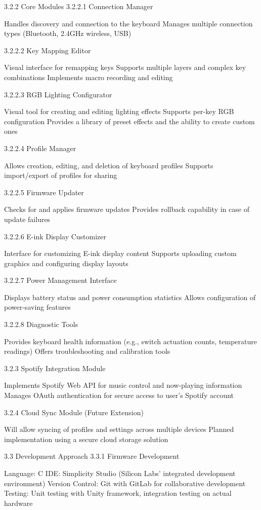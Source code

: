 \documentclass[a4paper,11pt]{article}%
\begin{document}
3.2.2 Core Modules
3.2.2.1 Connection Manager

Handles discovery and connection to the keyboard
Manages multiple connection types (Bluetooth, 2.4GHz wireless, USB)

3.2.2.2 Key Mapping Editor

Visual interface for remapping keys
Supports multiple layers and complex key combinations
Implements macro recording and editing

3.2.2.3 RGB Lighting Configurator

Visual tool for creating and editing lighting effects
Supports per-key RGB configuration
Provides a library of preset effects and the ability to create custom ones

3.2.2.4 Profile Manager

Allows creation, editing, and deletion of keyboard profiles
Supports import/export of profiles for sharing

3.2.2.5 Firmware Updater

Checks for and applies firmware updates
Provides rollback capability in case of update failures

3.2.2.6 E-ink Display Customizer

Interface for customizing E-ink display content
Supports uploading custom graphics and configuring display layouts

3.2.2.7 Power Management Interface

Displays battery status and power consumption statistics
Allows configuration of power-saving features

3.2.2.8 Diagnostic Tools

Provides keyboard health information (e.g., switch actuation counts, temperature readings)
Offers troubleshooting and calibration tools

3.2.3 Spotify Integration Module

Implements Spotify Web API for music control and now-playing information
Manages OAuth authentication for secure access to user's Spotify account

3.2.4 Cloud Sync Module (Future Extension)

Will allow syncing of profiles and settings across multiple devices
Planned implementation using a secure cloud storage solution

3.3 Development Approach
3.3.1 Firmware Development

Language: C
IDE: Simplicity Studio (Silicon Labs' integrated development environment)
Version Control: Git with GitLab for collaborative development
Testing: Unit testing with Unity framework, integration testing on actual hardware
\end{document}
